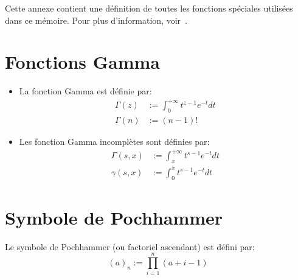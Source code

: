 {}



\label{special_functions}
Cette annexe contient une définition de toutes les fonctions spéciales utilisées dans ce mémoire. Pour plus d'information, voir~\cite{NIST:DLMF}.
\section*{Fonctions Gamma}
\begin{itemize}
    \item La fonction Gamma est définie par:
    \[
        \begin{aligned}
            \Gamma(z)&:=\int_0^{+\infty}t^{z-1}e^{-t}dt \\
            \Gamma(n)&:=(n-1)!
        \end{aligned}
    \]
    \item Les fonction Gamma incomplètes sont définies par:
    \[
    \begin{aligned}
        \Gamma(s,x)&:=\int_x^{+\infty}t^{s-1}e^{-t}dt \\
        \gamma(s,x)&:=\int_0^x t^{s-1}e^{-t}dt
    \end{aligned}
    \] 
\end{itemize}

\section*{Symbole de Pochhammer}
Le symbole de Pochhammer (ou factoriel ascendant) est défini par:
\[
{(a)}_n:=\prod_{i=1}^n (a+i-1)
\]

